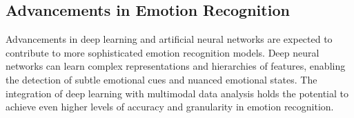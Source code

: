 \subsection{Advancements in Emotion Recognition}
Advancements in deep learning and artificial neural networks are expected to contribute to more sophisticated emotion recognition models. 
Deep neural networks can learn complex representations and hierarchies of features, enabling the detection of subtle emotional cues and nuanced emotional states. 
The integration of deep learning with multimodal data analysis holds the potential to achieve even higher levels of accuracy and granularity in emotion recognition.